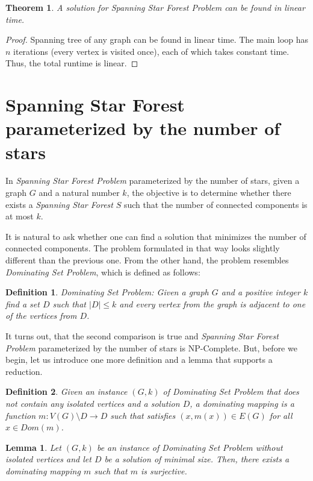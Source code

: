 \documentclass[en]{pracamgr}
\newtheorem{defi}{Definition}
\newtheorem{theorem}{Theorem}
\newtheorem{lemma}{Lemma}
\newcommand{\ssf}{\emph{Spanning Star Forest}}
\newcommand{\domsetp}{\emph{Dominating Set Problem}}
\newcommand{\kssf}{\emph{Spanning Star Forest Problem} parameterized by the number of stars}
\begin{document}
\begin{theorem}
	A solution for Spanning Star Forest Problem can be found in linear time.
\end{theorem}

\begin{proof}
	Spanning tree of any graph can be found in linear time. The main loop has $n$ 
	iterations (every vertex is visited once), each of which takes constant time.
	Thus, the total runtime is linear.
\end{proof}

\section{Spanning Star Forest parameterized by the number of stars}

In \kssf{}, given a graph $G$ and a natural number $k$, the objective is to determine whether there exists a \ssf{} $S$ such that the number of connected components is at most $k$.

It is natural to ask whether one can find a solution that minimizes the number of connected components. The problem formulated in that way looks slightly different than the previous one. From the other hand, the problem resembles \domsetp{}, which is defined as follows:

\begin{defi}
	\domsetp: Given a graph $G$ and a positive integer $k$ find a set $D$ such that $|D| \leq k$ and every vertex from the graph is adjacent to one of the vertices from $D$.
\end{defi}

It turns out, that the second comparison is true and \kssf{} is NP-Complete. But, before we begin, let us introduce one more definition and a lemma that supports a reduction.

\begin{defi}
	Given an instance $(G,k)$ of Dominating Set Problem that does not contain any isolated vertices and a solution $D$, a dominating mapping is a function $m:V(G) \setminus D \rightarrow D$ such that satisfies $(x,m(x)) \in E(G)$ for all $x \in Dom(m)$.
\end{defi}

\begin{lemma}\label{dom mapping}
	Let $(G,k)$ be an instance of \domsetp{} without isolated vertices and let $D$ be a solution of minimal size. Then, there exists a dominating mapping $m$ such that $m$ is surjective.
\end{lemma}
\end{document}
